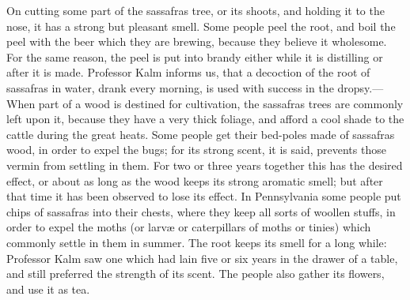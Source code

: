 \documentclass{article}
\begin{document}
On cutting some part of the sassafras tree, or its shoots, and holding it to the nose, it has a strong but pleasant smell. Some people peel the root, and boil the peel with the beer which they are brewing, because they believe it wholesome. For the same reason, the peel is put into brandy either while it is distilling or after it is made. Professor Kalm informs us, that a decoction of the root of sassafras in water, drank every morning, is used with success in the dropsy.—When part of a wood is destined for cultivation, the sassafras trees are commonly left upon it, because they have a very thick foliage, and afford a cool shade to the cattle during the great heats. Some people get their bed-poles made of sassafras wood, in order to expel the bugs; for its strong scent, it is said, prevents those vermin from settling in them. For two or three years together this has the desired effect, or about as long as the wood keeps its strong aromatic smell; but after that time it has been observed to lose its effect. In Pennsylvania some people put chips of sassafras into their chests, where they keep all sorts of woollen stuffs, in order to expel the moths (or larvæ or caterpillars of moths or tinies) which commonly settle in them in summer. The root keeps its smell for a long while: Professor Kalm saw one which had lain five or six years in the drawer of a table, and still preferred the strength of its scent. The people also gather its flowers, and use it as tea.
\end{document}
